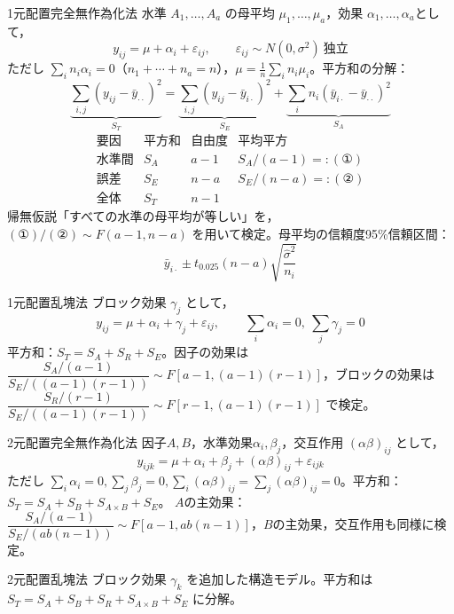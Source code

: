 \documentclass[a4paper,11pt]{ltjsarticle}
\begin{document}
\begin{term}{1元配置完全無作為化法}
水準 $A_1,\dots,A_a$ の母平均 $\mu_1,\dots,\mu_a$，効果 $\alpha_1,\dots,\alpha_a$として，
\[
y_{ij} = \mu + \alpha_i + \varepsilon_{ij}, \qquad \varepsilon_{ij}\sim N(0,\sigma^2)\ \text{独立}
\]
ただし $\sum_i n_i\alpha_i=0$（$n_1+\cdots+n_a=n$），$\mu=\frac1n\sum_i n_i\mu_i$。平方和の分解：
\[
\underbrace{\sum_{i,j}(y_{ij}-\bar y_{\cdot\cdot})^2}_{S_T} =
\underbrace{\sum_{i,j}(y_{ij}-\bar y_{i\cdot})^2}_{S_E} +
\underbrace{\sum_{i} n_i(\bar y_{i\cdot}-\bar y_{\cdot\cdot})^2}_{S_A}
\]
\[
\begin{array}{lccc}
\text{要因} & \text{平方和} & \text{自由度} & \text{平均平方} \\\hline
\text{水準間} & S_A & a-1 & S_A/(a-1) =: (\text{①}) \\
\text{誤差} & S_E & n-a & S_E/(n-a) =: (\text{②}) \\\hline
\text{全体} & S_T & n-1 &
\end{array}
\]
帰無仮説「すべての水準の母平均が等しい」を，$(\text{①})/(\text{②}) \sim F(a-1,n-a)$ を用いて検定。母平均の信頼度95\%信頼区間：
\[
\bar y_{i\cdot} \pm t_{0.025}(n-a)\sqrt{\frac{\hat\sigma^2}{n_i}}
\]
\end{term}

\begin{term}{1元配置乱塊法}
ブロック効果 $\gamma_j$ として，
\[
y_{ij} = \mu+\alpha_i+\gamma_j+\varepsilon_{ij}, \qquad \sum_i\alpha_i=0,\ \sum_j\gamma_j=0
\]
平方和：$S_T=S_A+S_R+S_E$。因子の効果は $\dfrac{S_A/(a-1)}{S_E/((a-1)(r-1))}\sim F[a-1,(a-1)(r-1)]$，ブロックの効果は $\dfrac{S_R/(r-1)}{S_E/((a-1)(r-1))}\sim F[r-1,(a-1)(r-1)]$ で検定。
\end{term}

\begin{term}{2元配置完全無作為化法}
因子$A,B$，水準効果$\alpha_i,\beta_j$，交互作用 $(\alpha\beta)_{ij}$ として，
\[
y_{ijk} = \mu+\alpha_i+\beta_j+(\alpha\beta)_{ij}+\varepsilon_{ijk}
\]
ただし $\sum_i\alpha_i=0,\sum_j\beta_j=0,\sum_i(\alpha\beta)_{ij}=\sum_j(\alpha\beta)_{ij}=0$。平方和：$S_T=S_A+S_B+S_{A\times B}+S_E$。
$A$の主効果：$\dfrac{S_A/(a-1)}{S_E/(ab(n-1))}\sim F[a-1,ab(n-1)]$，$B$の主効果，交互作用も同様に検定。
\end{term}

\begin{term}{2元配置乱塊法}
ブロック効果 $\gamma_k$ を追加した構造モデル。平方和は $S_T=S_A+S_B+S_R+S_{A\times B}+S_E$ に分解。
\end{term}
\end{document}
